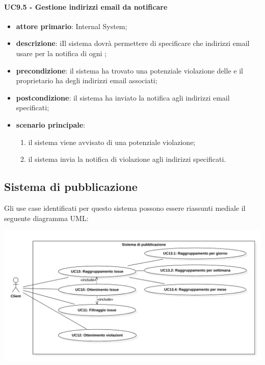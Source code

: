 \paragraph{UC9.5 -  Gestione indirizzi email da notificare}
\begin{itemize}
	\item \textbf{attore primario}: Internal System;
	\item \textbf{descrizione}: iIl sistema dovrà permettere di specificare che indirizzi email usare per la notifica di ogni ; 
	\item \textbf{precondizione}: il sistema ha trovato una potenziale violazione delle  e il  proprietario ha degli indirizzi email associati;
	\item \textbf{postcondizione}: il sistema ha inviato la notifica agli indirizzi email specificati;
	\item \textbf{scenario principale}: 
	\begin{enumerate}
		\item il sistema viene avvisato di una potenziale violazione;
		\item il sistema invia la notifica di violazione agli indirizzi specificati.
	\end{enumerate}
\end{itemize}

\subsection{Sistema di pubblicazione}
Gli use case identificati per questo sistema possono essere riassunti mediale il seguente diagramma UML:
\begin{center}
	\includegraphics[keepaspectratio = true, width=15cm]{immagini/uc/7.png}
\end{center}
